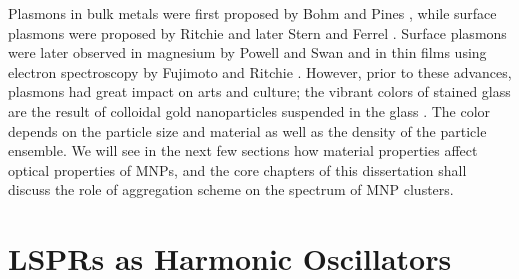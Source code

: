 \documentclass [11pt, proquest] {uwthesis}[2016/11/22]
\begin{document}
Plasmons in bulk metals were first proposed by Bohm and Pines \cite{BohmPines1,BohmPines2,BohmPines3}, while surface plasmons were proposed by Ritchie and later Stern and Ferrel \cite{SternFerrel}. Surface plasmons were later observed in magnesium by Powell and Swan\cite{PowellSwan} and in thin films using electron spectroscopy by Fujimoto \cite{Fujimoto} and Ritchie \cite{Ritchie}. However, prior to these advances, plasmons had great impact on arts and culture; the vibrant colors of stained glass are the result of colloidal gold nanoparticles suspended in the glass \cite{stainedglass}. The color depends on the particle size and material as well as the density of the particle ensemble. We will see in the next few sections how material properties affect optical properties of MNPs, and the core chapters of this dissertation shall discuss the role of aggregation scheme on the spectrum of MNP clusters.

\section{LSPRs as Harmonic Oscillators}
\end{document}
